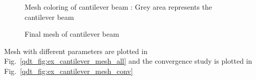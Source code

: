     \begin{figure}
        \centering
        \caption[Mesh coloring of cantilever beam]{Mesh coloring of cantilever beam : Grey area represents the cantilever beam}
        \label{qdt_fig:ex_cantilever_beam_mesh_coloring}
    \end{figure}

    \begin{figure}
        \centering
        \caption[Final mesh of cantilever beam]{Final mesh of cantilever beam}
        \label{qdt_fig:ex_cantilever_beam_mesh_final}
    \end{figure}
Mesh with different parameters are plotted in Fig.~\ref{qdt_fig:ex_cantilever_mesh_all} and the convergence study is plotted in Fig.~\ref{qdt_fig:ex_cantilever_mesh_conv}

